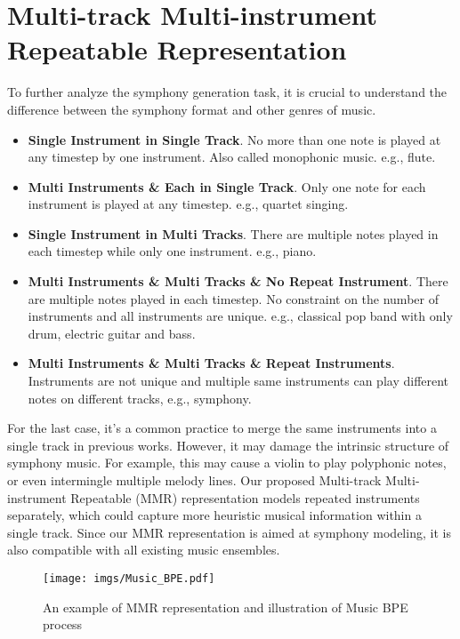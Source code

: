 \documentclass{article}
\begin{document}
\section{Multi-track Multi-instrument Repeatable Representation}\label{MMR Representation}
To further analyze the symphony generation task, it is crucial to understand the difference between the symphony format and other genres of music.
\begin{itemize}[leftmargin=*]
 \item \textbf{Single Instrument in Single Track}. No more than one note is played at any timestep by one instrument. Also called monophonic music. e.g., flute.
 \item \textbf{Multi Instruments \& Each in Single Track}. Only one note for each instrument is played at any timestep. e.g., quartet singing.
 \item \textbf{Single Instrument in Multi Tracks}. There are multiple notes played in each timestep while only one instrument. e.g., piano.
 \item \textbf{Multi Instruments \& Multi Tracks \& No Repeat Instrument}. There are multiple notes played in each timestep. No constraint on the number of instruments and all instruments are unique. e.g., classical pop band with only drum, electric guitar and bass.
 \item \textbf{Multi Instruments \& Multi Tracks \& Repeat Instruments}. Instruments are not unique and multiple same instruments can play different notes on different tracks, e.g., symphony.
\end{itemize}

For the last case, it's a common practice to merge the same instruments into a single track in previous works. However, it may damage the intrinsic structure of symphony music. For example, this may cause a violin to play polyphonic notes, or even intermingle multiple melody lines. Our proposed Multi-track Multi-instrument Repeatable (MMR) representation models repeated instruments separately, which could capture more heuristic musical information within a single track. Since our MMR representation is aimed at symphony modeling, it is also compatible with all existing music ensembles.


\begin{figure*}[t]
  \centering
  \centerline{\texttt{[image: imgs/Music\_BPE.pdf]}}
  \caption{An example of MMR representation and illustration of Music BPE process}
  \label{fig:mmr}
\end{figure*}
\end{document}
